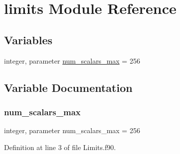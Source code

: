 \hypertarget{namespacelimits}{}\section{limits Module Reference}
\label{namespacelimits}
\subsection*{Variables}
\begin{DoxyCompactItemize}
\item 
integer, parameter \hyperlink{namespacelimits_aee7aa4dccb2ef9eeabd15a566b0f94e7}{num\+\_\+scalars\+\_\+max} = 256
\end{DoxyCompactItemize}


\subsection{Variable Documentation}
\hypertarget{namespacelimits_aee7aa4dccb2ef9eeabd15a566b0f94e7}{}\label{namespacelimits_aee7aa4dccb2ef9eeabd15a566b0f94e7} 
\subsubsection{\texorpdfstring{num\+\_\+scalars\+\_\+max}{num\_scalars\_max}}
{\footnotesize\ttfamily integer, parameter num\+\_\+scalars\+\_\+max = 256}



Definition at line 3 of file Limits.\+f90.


